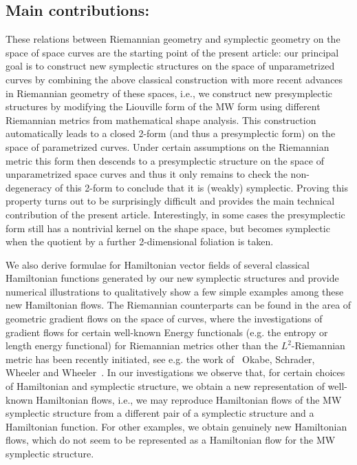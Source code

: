 \documentclass[12pt]{amsart}
\newcommand{\rev}[1]{#1}
\theoremstyle{definition}
\begin{document}
\subsection*{Main contributions:} 
These relations between Riemannian geometry and symplectic geometry on the space of space curves are the starting point of the present article: our principal goal is to construct new symplectic structures on the space of unparametrized curves by combining the above classical construction with more recent advances in Riemannian geometry of these spaces, i.e., we construct new presymplectic structures by modifying the Liouville form of the MW form using different Riemannian metrics from mathematical shape analysis. This construction automatically leads to a closed 2-form (and thus a presymplectic form) on the space of parametrized curves. Under certain assumptions on the Riemannian metric this form then descends to a presymplectic structure on the space of unparametrized space curves and thus it only remains to check the non-degeneracy of this 2-form to conclude that it is (weakly) symplectic. Proving this property turns out to be surprisingly difficult and provides the main technical contribution of the present article. Interestingly, in some cases the presymplectic form still has a nontrivial kernel on the shape space, but becomes symplectic when the quotient by a further 2-dimensional foliation is taken. 



We also derive formulae for Hamiltonian vector fields of several classical Hamiltonian functions generated by our new symplectic structures and provide numerical illustrations to qualitatively show a few simple examples among these new Hamiltonian flows. The Riemannian counterparts can be found in the area of geometric gradient flows on the space of curves, where the investigations of gradient flows for certain well-known Energy functionals (e.g. the entropy or length energy functional) for Riemannian metrics other than the $L^2$-Riemannian metric has been recently initiated, see e.g. the work of ~Okabe, Schrader, Wheeler and Wheeler~\cite{okabe2023sobolev,schrader2023h}.
In our investigations we observe that, for certain choices of Hamiltonian and symplectic structure, we obtain a new representation of well-known Hamiltonian flows, i.e., we may reproduce Hamiltonian flows of the MW symplectic structure from a different pair of a symplectic structure and a Hamiltonian function. For other examples, we obtain genuinely new Hamiltonian flows, which do not seem to be represented as a Hamiltonian flow for the MW symplectic structure. 
\end{document}
